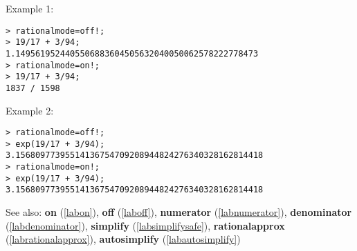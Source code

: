 \noindent Example 1: 
\begin{center}\begin{minipage}{15cm}\begin{Verbatim}[frame=single]
> rationalmode=off!;
> 19/17 + 3/94;
1.1495619524405506883604505632040050062578222778473
> rationalmode=on!;
> 19/17 + 3/94;
1837 / 1598
\end{Verbatim}
\end{minipage}\end{center}
\noindent Example 2: 
\begin{center}\begin{minipage}{15cm}\begin{Verbatim}[frame=single]
> rationalmode=off!;
> exp(19/17 + 3/94);
3.15680977395514136754709208944824276340328162814418
> rationalmode=on!;
> exp(19/17 + 3/94);
3.15680977395514136754709208944824276340328162814418
\end{Verbatim}
\end{minipage}\end{center}
See also: \textbf{on} (\ref{labon}), \textbf{off} (\ref{laboff}), \textbf{numerator} (\ref{labnumerator}), \textbf{denominator} (\ref{labdenominator}), \textbf{simplify} (\ref{labsimplifysafe}), \textbf{rationalapprox} (\ref{labrationalapprox}), \textbf{autosimplify} (\ref{labautosimplify})
